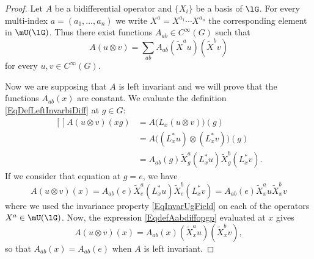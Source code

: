 \begin{proof}
	Let $A$ be a bidifferential operator and $\{ X_i \}$ be a basis of $\lG$. For every multi-index $a=(a_1,\ldots,a_n)$ we write $X^a=X^{a_1}\cdots X^{a_n}$ the corresponding element in $\mU(\lG)$. Thus there exist functions $A_{ab}\in C^{\infty}(G)$ such that
	\begin{equation}	\label{EqdefAabdiffopgp}
		A(u\otimes v)=\sum_{ab}A_{ab}(\tilde X^au)(\tilde X^bv)
	\end{equation}
	for every $u,v\in C^{\infty}(G)$.

	Now we are supposing that $A$ is left invariant and we will prove that the functions $A_{ab}(x)$ are constant. We evaluate the definition \eqref{EqDefLeftInvarbiDiff} at $g\in G$:
	\begin{equation}
		\begin{aligned}[]
			A(u\otimes v)(xg)&=A\big( L_x(u\otimes v) \big)(g)\\
					&=A\big( (L^*_xu)\otimes (L^*_xv) \big)(g)\\
					&=A_{ab}(g)\tilde X^a_g(L^*_xu)\tilde X^b_g(L^*_xv).
		\end{aligned}
	\end{equation}
	If we consider that equation at $g=e$, we have
	\begin{equation}
		A(u\otimes v)(x)=A_{ab}(e)\tilde X^a_e(L^*_xu)\tilde X^b_e(L^*_xv)=A_{ab}(e)\tilde X^a_xu\tilde X^b_xv
	\end{equation}
	where we used the invariance property \eqref{EqInvarUgField} on each of the operators $X^a\in\mU(\lG)$. Now, the expression \eqref{EqdefAabdiffopgp} evaluated at $x$ gives
	\begin{equation}
		A(u\otimes v)(x)=A_{ab}(x)(\tilde X_x^au)(\tilde X_x^bv),
	\end{equation}
	so that $A_{ab}(x)=A_{ab}(e)$ when $A$ is left invariant.
\end{proof}

